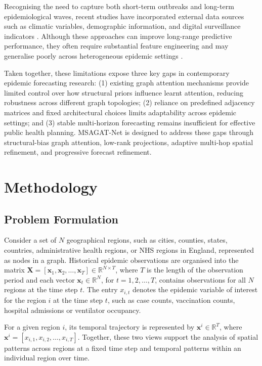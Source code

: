 \documentclass[final,1p,times]{elsarticle}
\begin{document}
Recognising the need to capture both short-term outbreaks and long-term epidemiological waves, recent studies have incorporated external data sources such as climatic variables, demographic information, and digital surveillance indicators \cite{Luo2023Interpretable, Moss_Zarebski_Dawson_Franklin_Birrell_McCaw_2020}. Although these approaches can improve long-range predictive performance, they often require substantial feature engineering and may generalise poorly across heterogeneous epidemic settings \cite{Panja2022Epicasting}.

Taken together, these limitations expose three key gaps in contemporary epidemic forecasting research: (1) existing graph attention mechanisms provide limited control over how structural priors influence learnt attention, reducing robustness across different graph topologies; (2) reliance on predefined adjacency matrices and fixed architectural choices limits adaptability across epidemic settings; and (3) stable multi-horizon forecasting remains insufficient for effective public health planning. MSAGAT-Net is designed to address these gaps through structural-bias graph attention, low-rank projections, adaptive multi-hop spatial refinement, and progressive forecast refinement.

\section{Methodology}
\label{sec:methodology}

\subsection{Problem Formulation}

Consider a set of $N$ geographical regions, such as cities, counties, states, countries, administrative health regions, or NHS regions in England, represented as nodes in a graph. Historical epidemic observations are organised into the matrix $\mathbf{X} = [\mathbf{x}_1, \mathbf{x}_2, \ldots, \mathbf{x}_T] \in \mathbb{R}^{N \times T}$, where $T$ is the length of the observation period and each vector $\mathbf{x}_t \in \mathbb{R}^N$, for $t = 1, 2, \ldots, T$, contains observations for all $N$ regions at the time step $t$. The entry $x_{i,t}$ denotes the epidemic variable of interest for the region $i$ at the time step $t$, such as case counts, vaccination counts, hospital admissions or ventilator occupancy.

For a given region $i$, its temporal trajectory is represented by $\mathbf{x}^i \in \mathbb{R}^T$, where $\mathbf{x}^i = [x_{i,1}, x_{i,2}, \ldots, x_{i,T}]$. Together, these two views support the analysis of spatial patterns across regions at a fixed time step and temporal patterns within an individual region over time.
\end{document}
